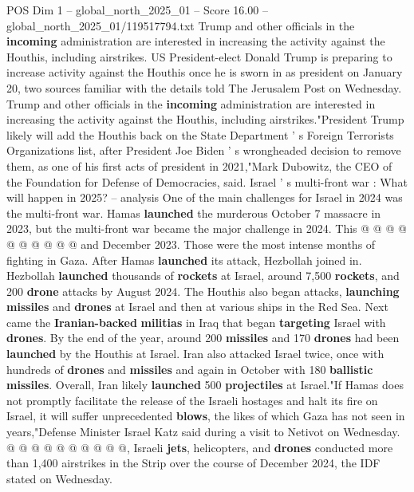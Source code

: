 \begin{textsample}{POS Dim 1 – global\_north\_2025\_01 – Score 16.00 – global\_north\_2025\_01/119517794.txt}  \label{ex:f1_pos_396}
Trump and other officials in the \textbf{incoming} administration are interested in increasing the activity against the Houthis, including airstrikes.
US President-elect Donald Trump is preparing to increase activity against the Houthis once he is sworn in as president on January 20, two sources familiar with the details told The Jerusalem Post on Wednesday.
Trump and other officials in the \textbf{incoming} administration are interested in increasing the activity against the Houthis, including airstrikes."President Trump likely will add the Houthis back on the State Department ' s Foreign Terrorists Organizations list, after President Joe Biden ' s wrongheaded decision to remove them, as one of his first acts of president in 2021,"Mark Dubowitz, the CEO of the Foundation for Defense of Democracies, said.
Israel ' s multi-front war : What will happen in 2025? -- analysis One of the main challenges for Israel in 2024 was the multi-front war.
Hamas \textbf{launched} the murderous October 7 massacre in 2023, but the multi-front war became the major challenge in 2024.
This @ @ @ @ @ @ @ @ @ @ and December 2023.
Those were the most intense months of fighting in Gaza.
After Hamas \textbf{launched} its attack, Hezbollah joined in.
Hezbollah \textbf{launched} thousands of \textbf{rockets} at Israel, around 7,500 \textbf{rockets}, and 200 \textbf{drone} attacks by August 2024.
The Houthis also began attacks, \textbf{launching} \textbf{missiles} and \textbf{drones} at Israel and then at various ships in the Red Sea.
Next came the \textbf{Iranian-backed} \textbf{militias} in Iraq that began \textbf{targeting} Israel with \textbf{drones}.
By the end of the year, around 200 \textbf{missiles} and 170 \textbf{drones} had been \textbf{launched} by the Houthis at Israel.
Iran also attacked Israel twice, once with hundreds of \textbf{drones} and \textbf{missiles} and again in October with 180 \textbf{ballistic} \textbf{missiles}.
Overall, Iran likely \textbf{launched} 500 \textbf{projectiles} at Israel."If Hamas does not promptly facilitate the release of the Israeli hostages and halt its fire on Israel, it will suffer unprecedented \textbf{blows}, the likes of which Gaza has not seen in years,"Defense Minister Israel Katz said during a visit to Netivot on Wednesday. @ @ @ @ @ @ @ @ @ @, Israeli \textbf{jets}, helicopters, and \textbf{drones} conducted more than 1,400 airstrikes in the Strip over the course of December 2024, the IDF stated on Wednesday.

\end{textsample}
